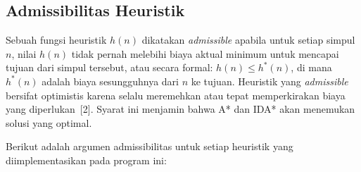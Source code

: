 \documentclass[12pt,a4paper]{article}
\begin{document}
\subsection{Admissibilitas Heuristik}

Sebuah fungsi heuristik $h(n)$ dikatakan \textit{admissible} apabila untuk setiap
simpul $n$, nilai $h(n)$ tidak pernah melebihi biaya aktual minimum untuk mencapai
tujuan dari simpul tersebut, atau secara formal: $h(n) \leq h^*(n)$, di mana
$h^*(n)$ adalah biaya sesungguhnya dari $n$ ke tujuan. Heuristik yang \textit{admissible}
bersifat optimistis karena selalu meremehkan atau tepat memperkirakan biaya yang
diperlukan~[2]. Syarat ini menjamin bahwa A* dan IDA*
akan menemukan solusi yang optimal.

Berikut adalah argumen admissibilitas untuk setiap heuristik yang diimplementasikan
pada program ini:
\end{document}
